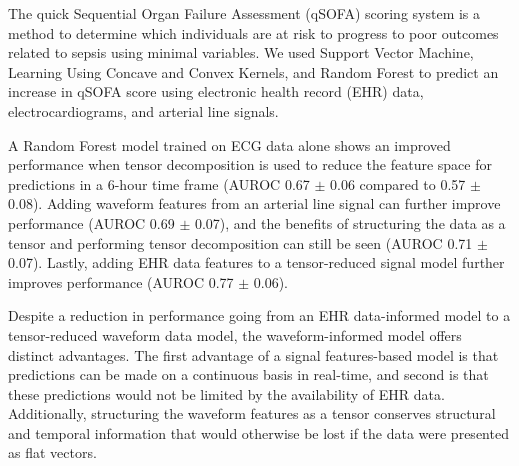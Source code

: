 
The quick Sequential Organ Failure Assessment (qSOFA) scoring system is a method to determine which individuals are at risk to progress to poor outcomes related to sepsis using minimal variables. We used Support Vector Machine, Learning Using Concave and Convex Kernels, and Random Forest to predict an increase in qSOFA score using electronic health record (EHR) data, electrocardiograms, and arterial line signals.

A Random Forest model trained on ECG data alone shows an improved performance when tensor decomposition is used to reduce the feature space for predictions in a 6-hour time frame (AUROC 0.67 $\pm$ 0.06 compared to 0.57 $\pm$ 0.08). Adding waveform features from an arterial line signal can further improve performance (AUROC 0.69 $\pm$ 0.07), and the benefits of structuring the data as a tensor and performing tensor decomposition can still be seen (AUROC 0.71 $\pm$ 0.07). Lastly, adding EHR data features to a tensor-reduced signal model further improves performance (AUROC 0.77 $\pm$ 0.06).

Despite a reduction in performance going from an EHR data-informed model to a tensor-reduced waveform data model, the waveform-informed model offers distinct advantages. The first advantage of a signal features-based model is that predictions can be made on a continuous basis in real-time, and second is that these predictions would not be limited by the availability of EHR data. Additionally, structuring the waveform features as a tensor conserves structural and temporal information that would otherwise be lost if the data were presented as flat vectors.